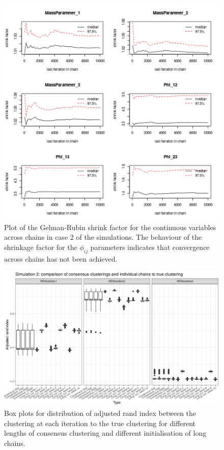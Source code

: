 \documentclass[12pt]{article} %
\begin{document}
	
	\begin{figure}[!htb]
			\centering
			\includegraphics[scale=0.65]{Images/Gen_data/Case_2/Gelman_plot_burn_20000.png}
			\caption{Plot of the  Gelman-Rubin shrink factor for the continuous variables across chains in case 2 of the simulations. The behaviour of the shrinkage factor for the $\phi_{ij}$ parameters indicates that convergence across chains has not been achieved.}
			\label{fig:gen_data_case_2_gelman_plot}
		\end{figure}
	
	
		\begin{figure}
		\centering
		\includegraphics[scale=0.9]{Images/Gen_data/Case_2/box_plot_ari_true_clustering_burn_in.png}
		\caption{Box plots for distribution of adjusted rand index between the clustering at each iteration to the true clustering for different lengths of consensus clustering and different initialisation of long chains.}
		\label{fig:gen_data_case_2_boxplot}
	\end{figure}
\end{document}

